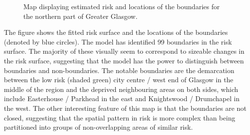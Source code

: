 \documentclass[article,shortnames,nojss]{jss}
\begin{document}
\begin{figure}
\begin{center}
\end{center}
\vspace{-1cm}\caption{Map displaying estimated risk and locations of the boundaries for the northern part of Greater Glasgow.}\label{figure_boundary}
\end{figure}


The figure shows the fitted risk surface and the locations of the boundaries (denoted by blue circles).  The model has identified 99 boundaries in the risk surface. The majority of these visually seem to correspond to sizeable changes in the risk surface, suggesting that the model has the power to distinguish between boundaries and non-boundaries. The notable boundaries are the demarcation between the low risk (shaded green) city centre / west end of Glasgow in the middle of the region and the deprived neighbouring areas on both sides, which include Easterhouse / Parkhead in the east and Knightswood / Drumchapel in the west. The other interesting feature of this map is that the boundaries are not closed, suggesting that the spatial pattern in risk is more complex than being partitioned into groups of non-overlapping areas of similar risk.
\end{document}
